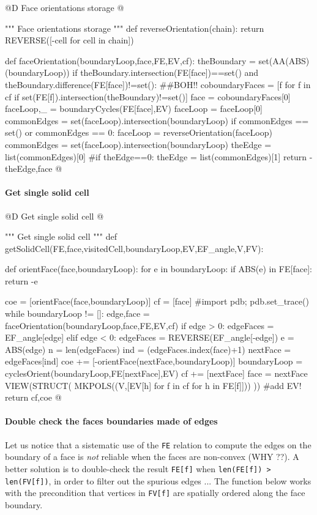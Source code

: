 \documentclass[11pt,oneside]{article}    %
\begin{document}
@D Face orientations storage
@{""" Face orientations storage """
def reverseOrientation(chain):
    return REVERSE([-cell for cell in chain])

def faceOrientation(boundaryLoop,face,FE,EV,cf):
    theBoundary = set(AA(ABS)(boundaryLoop))
    if theBoundary.intersection(FE[face])==set() and theBoundary.difference(FE[face])!=set(): ##BOH!!
        coboundaryFaces = [f for f in cf if set(FE[f]).intersection(theBoundary)!=set()]
        face = coboundaryFaces[0]            
    faceLoop,_ = boundaryCycles(FE[face],EV)
    faceLoop = faceLoop[0]
    commonEdges = set(faceLoop).intersection(boundaryLoop)
    if commonEdges == set() or commonEdges == {0}: 
        faceLoop = reverseOrientation(faceLoop)
        commonEdges = set(faceLoop).intersection(boundaryLoop)
    theEdge = list(commonEdges)[0]
    #if theEdge==0: theEdge = list(commonEdges)[1]
    return -theEdge,face
@}

\paragraph{Get single solid cell}

@D Get single solid cell
@{""" Get single solid cell """
def getSolidCell(FE,face,visitedCell,boundaryLoop,EV,EF_angle,V,FV):

    def orientFace(face,boundaryLoop): 
        for e in boundaryLoop:
            if ABS(e) in FE[face]: return -e

    coe = [orientFace(face,boundaryLoop)]
    cf = [face] 
    #import pdb; pdb.set_trace()
    while boundaryLoop != []:
        edge,face = faceOrientation(boundaryLoop,face,FE,EV,cf)
        if edge > 0: edgeFaces = EF_angle[edge]
        elif edge < 0: edgeFaces = REVERSE(EF_angle[-edge])
        e = ABS(edge)
        n = len(edgeFaces)
        ind = (edgeFaces.index(face)+1)%
        nextFace = edgeFaces[ind]
        coe += [-orientFace(nextFace,boundaryLoop)]
        boundaryLoop = cyclesOrient(boundaryLoop,FE[nextFace],EV)
        cf += [nextFace] 
        face = nextFace
        VIEW(STRUCT( MKPOLS((V,[EV[h] for f in cf for h in FE[f]])) )) #add EV!
    return cf,coe
@}

\paragraph{Double check the faces boundaries made of edges}
Let us notice that a sistematic use of the \texttt{FE} relation to compute the edges on the boundary of a face is \emph{not} reliable when the faces are non-convex (WHY ??). A better solution is to double-check the result \texttt{FE[f]} when \texttt{len(FE[f]) > len(FV[f])}, in order to filter out the spurious edges ...
The function below works with the precondition that vertices in \texttt{FV[f]} are spatially ordered along the face boundary.
\end{document}
